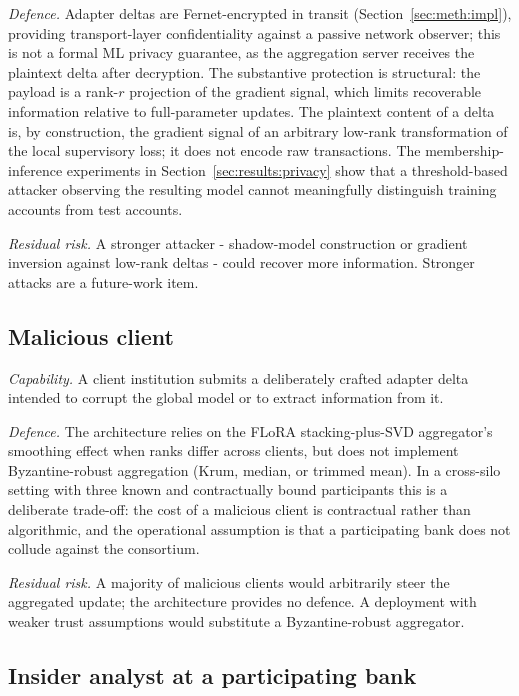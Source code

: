\documentclass{report}
\begin{document}
\textit{Defence.} Adapter deltas are Fernet-encrypted in transit (Section~\ref{sec:meth:impl}), providing transport-layer confidentiality against a passive network observer; this is not a formal ML privacy guarantee, as the aggregation server receives the plaintext delta after decryption. The substantive protection is structural: the payload is a rank-$r$ projection of the gradient signal, which limits recoverable information relative to full-parameter updates. The plaintext content of a delta is, by construction, the gradient signal of an arbitrary low-rank transformation of the local supervisory loss; it does not encode raw transactions. The membership-inference experiments in Section~\ref{sec:results:privacy} show that a threshold-based attacker observing the resulting model cannot meaningfully distinguish training accounts from test accounts.

\textit{Residual risk.} A stronger attacker - shadow-model construction or gradient inversion against low-rank deltas - could recover more information. Stronger attacks are a future-work item.

\subsection{Malicious client}

\textit{Capability.} A client institution submits a deliberately crafted adapter delta intended to corrupt the global model or to extract information from it.

\textit{Defence.} The architecture relies on the FLoRA stacking-plus-SVD aggregator's smoothing effect when ranks differ across clients, but does not implement Byzantine-robust aggregation (Krum, median, or trimmed mean). In a cross-silo setting with three known and contractually bound participants this is a deliberate trade-off: the cost of a malicious client is contractual rather than algorithmic, and the operational assumption is that a participating bank does not collude against the consortium.

\textit{Residual risk.} A majority of malicious clients would arbitrarily steer the aggregated update; the architecture provides no defence. A deployment with weaker trust assumptions would substitute a Byzantine-robust aggregator.

\subsection{Insider analyst at a participating bank}
\end{document}
